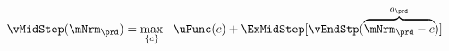   \begin{equation}\begin{gathered}\begin{aligned}
        \vMidStep(\mNrm_{\prd}) & = \max_{\{{c}\}}~~\uFunc({c}) +\ExMidStep[ \vEndStp(\overbrace{\mNrm_{\prd}-{c}}^{a_{\prd}})] \label{eq:vMidStep}
      \end{aligned}\end{gathered}\end{equation}

